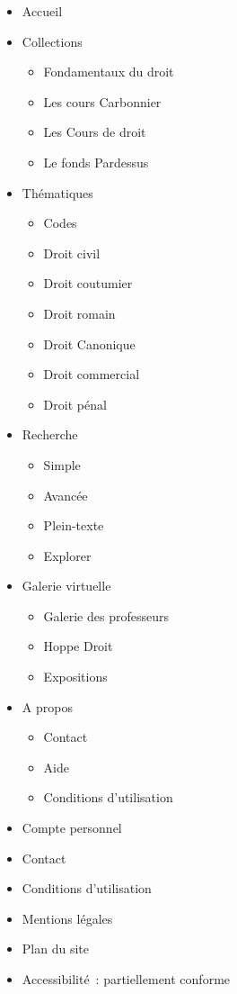 \begin{itemize}
	\item Accueil
\item Collections
\begin{itemize}
	\item Fondamentaux du droit 
\item Les cours Carbonnier
\item Les Cours de droit
\item Le fonds Pardessus
\end{itemize} 
\item Thématiques 
\begin{itemize}
	\item Codes
\item Droit civil
\item Droit coutumier
\item Droit romain
\item Droit Canonique
\item Droit commercial
\item Droit pénal
\end{itemize}
\item Recherche
\begin{itemize}
	\item Simple
\item Avancée
\item Plein-texte
\item Explorer
\end{itemize}
\item Galerie virtuelle
\begin{itemize}
	\item Galerie des professeurs
\item Hoppe Droit
\item Expositions
\end{itemize}
\item A propos
\begin{itemize}
	\item Contact
\item Aide
\item Conditions d’utilisation
\end{itemize}
\item Compte personnel
\item Contact
\item Conditions d’utilisation
\item Mentions légales
\item Plan du site 
\item Accessibilité : partiellement conforme

\end{itemize}
